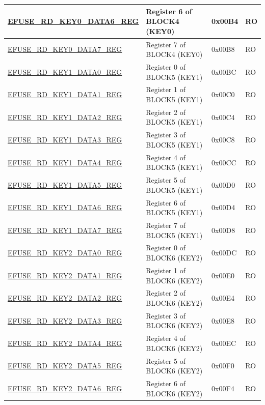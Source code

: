 \begin{longtable}{ | p{5.8cm} | p{7cm} | p{1.3cm} | p{1.2cm} | }
\hyperref[regdesc:EFUSERDKEY0DATA6REG]{EFUSE\_RD\_KEY0\_DATA6\_REG} & Register 6 of BLOCK4 (KEY0) & 0x00B4 & RO \\ \hline
\hyperref[regdesc:EFUSERDKEY0DATA7REG]{EFUSE\_RD\_KEY0\_DATA7\_REG} & Register 7 of BLOCK4 (KEY0) & 0x00B8 & RO \\ \hline
\hyperref[regdesc:EFUSERDKEY1DATA0REG]{EFUSE\_RD\_KEY1\_DATA0\_REG} & Register 0 of BLOCK5 (KEY1) & 0x00BC & RO \\ \hline
\hyperref[regdesc:EFUSERDKEY1DATA1REG]{EFUSE\_RD\_KEY1\_DATA1\_REG} & Register 1 of BLOCK5 (KEY1) & 0x00C0 & RO \\ \hline
\hyperref[regdesc:EFUSERDKEY1DATA2REG]{EFUSE\_RD\_KEY1\_DATA2\_REG} & Register 2 of BLOCK5 (KEY1) & 0x00C4 & RO \\ \hline
\hyperref[regdesc:EFUSERDKEY1DATA3REG]{EFUSE\_RD\_KEY1\_DATA3\_REG} & Register 3 of BLOCK5 (KEY1) & 0x00C8 & RO \\ \hline
\hyperref[regdesc:EFUSERDKEY1DATA4REG]{EFUSE\_RD\_KEY1\_DATA4\_REG} & Register 4 of BLOCK5 (KEY1) & 0x00CC & RO \\ \hline
\hyperref[regdesc:EFUSERDKEY1DATA5REG]{EFUSE\_RD\_KEY1\_DATA5\_REG} & Register 5 of BLOCK5 (KEY1) & 0x00D0 & RO \\ \hline
\hyperref[regdesc:EFUSERDKEY1DATA6REG]{EFUSE\_RD\_KEY1\_DATA6\_REG} & Register 6 of BLOCK5 (KEY1) & 0x00D4 & RO \\ \hline
\hyperref[regdesc:EFUSERDKEY1DATA7REG]{EFUSE\_RD\_KEY1\_DATA7\_REG} & Register 7 of BLOCK5 (KEY1) & 0x00D8 & RO \\ \hline
\hyperref[regdesc:EFUSERDKEY2DATA0REG]{EFUSE\_RD\_KEY2\_DATA0\_REG} & Register 0 of BLOCK6 (KEY2) & 0x00DC & RO \\ \hline
\hyperref[regdesc:EFUSERDKEY2DATA1REG]{EFUSE\_RD\_KEY2\_DATA1\_REG} & Register 1 of BLOCK6 (KEY2) & 0x00E0 & RO \\ \hline
\hyperref[regdesc:EFUSERDKEY2DATA2REG]{EFUSE\_RD\_KEY2\_DATA2\_REG} & Register 2 of BLOCK6 (KEY2) & 0x00E4 & RO \\ \hline
\hyperref[regdesc:EFUSERDKEY2DATA3REG]{EFUSE\_RD\_KEY2\_DATA3\_REG} & Register 3 of BLOCK6 (KEY2) & 0x00E8 & RO \\ \hline
\hyperref[regdesc:EFUSERDKEY2DATA4REG]{EFUSE\_RD\_KEY2\_DATA4\_REG} & Register 4 of BLOCK6 (KEY2) & 0x00EC & RO \\ \hline
\hyperref[regdesc:EFUSERDKEY2DATA5REG]{EFUSE\_RD\_KEY2\_DATA5\_REG} & Register 5 of BLOCK6 (KEY2) & 0x00F0 & RO \\ \hline
\hyperref[regdesc:EFUSERDKEY2DATA6REG]{EFUSE\_RD\_KEY2\_DATA6\_REG} & Register 6 of BLOCK6 (KEY2) & 0x00F4 & RO \\ \hline

\end{longtable}
